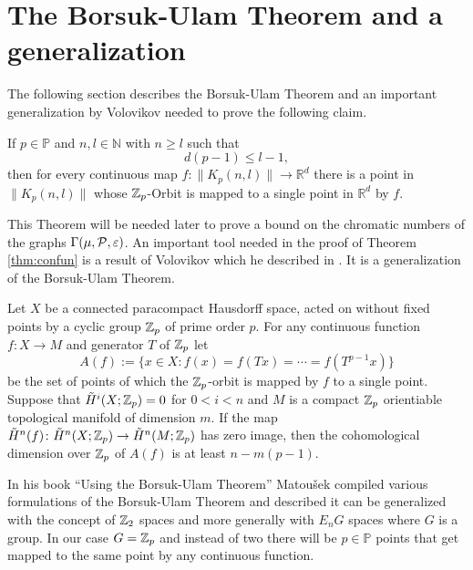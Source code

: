 \section{The Borsuk-Ulam Theorem and a generalization}\label{sec:borsuk}

The following section describes the Borsuk-Ulam Theorem and an important generalization by Volovikov needed to prove the following claim.
\begin{thm}\label{thm:confun}
  If $p \in \mathbb{P}$ and $n, l \in \mathbb{N}$ with $n \geq l$ such that
  \begin{equation*}
    d(p-1) \leq l-1,
  \end{equation*}
  then for every continuous map $f\colon\lVert K_p(n,l)\rVert \to \mathbb{R}^d$ there is a point in $\lVert K_p(n,l)\rVert$ whose $\Z_p$-Orbit is mapped to a single point in $\mathbb{R}^d$ by $f$.
\end{thm}
This Theorem will be needed later to prove a bound on the chromatic numbers of the graphs $\Gamma(\mu, \P, \varepsilon)$.
An important tool needed in the proof of Theorem \ref{thm:confun} is a result of Volovikov which he described in \cite{vol1980}. It is a generalization of the Borsuk-Ulam Theorem.
\begin{lemma}\label{lem:vol}
  Let $X$ be a connected paracompact Hausdorff space, acted on without fixed points by a cyclic group $\Z_p$ of prime order $p$. For any continuous function $f\colon X \to M$ and generator $T$ of $\Z_p$ let
  \begin{equation*}
    A(f) := \{x\in X\colon f(x) = f(Tx) = \cdots = f(T^{p-1}x)\}
  \end{equation*}
  be the set of points of which the $\Z_p$-orbit is mapped by $f$ to a single point. Suppose that $\tilde{H}^i(X; \Z_p) = 0$ for $0 < i < n$ and $M$ is a compact $\Z_p$ orientiable topological manifold of dimension $m$. If the map $\tilde{H}^n(f)\colon \tilde{H}^n(X; \Z_p) \to \tilde{H}^n(M; \Z_p)$ has zero image, then the cohomological dimension over $\Z_p$ of $A(f)$ is at least $n-m(p-1)$. 
\end{lemma}

In his book ``Using the Borsuk-Ulam Theorem'' \cite{using2003} Matoušek compiled various formulations of the Borsuk-Ulam Theorem and described it can be generalized with the concept of $\Z_2$ spaces and more generally with $E_nG$ spaces where $G$ is a group. In our case $G = \Z_p$ and instead of two there will be $p \in \mathbb{P}$ points that get mapped to the same point by any continuous function. 

